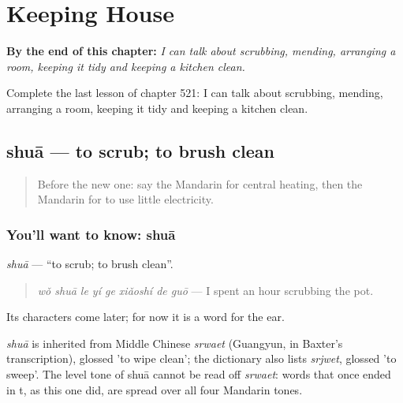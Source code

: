 
\chapter{Keeping House}
\label{ch:zh-keeping-house}

\begin{chapteropening}
\textbf{By the end of this chapter:} \emph{I can talk about scrubbing, mending, arranging a room, keeping it tidy and keeping a kitchen clean.}

Complete the last lesson of chapter 521: I can talk about scrubbing, mending, arranging a room, keeping it tidy and keeping a kitchen clean.
\end{chapteropening}

\section[shuā]{shuā — to scrub; to brush clean}

\label{lesson:ZH-C521-shua-scrub}



\begin{quote}
Before the new one: say the Mandarin for central heating, then the Mandarin for to use little electricity.
\end{quote}

\subsection*{You'll want to know: shuā}
\emph{shuā} — \textquotedblleft{}to scrub; to brush clean\textquotedblright{}.

\begin{quote}
\emph{wǒ shuā le yí ge xiǎoshí de guō} — I spent an hour scrubbing the pot.
\end{quote}

Its characters come later; for now it is a word for the ear.

\begin{cousinweb}
\emph{shuā} is inherited from Middle Chinese \emph{srwaet} (Guangyun, in Baxter's transcription), glossed 'to wipe clean'; the dictionary also lists \emph{srjwet}, glossed 'to sweep'. The level tone of shuā cannot be read off \emph{srwaet}: words that once ended in t, as this one did, are spread over all four Mandarin tones.
\end{cousinweb}

